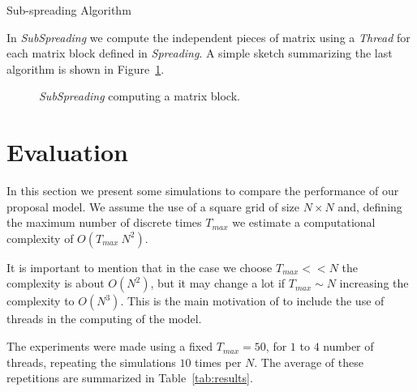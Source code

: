 \documentclass[conference]{IEEEtran}
\begin{document}
      \begin{algorithm}[!ht]
        \begin{algorithmic}
              \EndFor
            \EndFor
          \EndProcedure
        \end{algorithmic}
        \caption{Sub-spreading Algorithm}
        \label{alg:subspreading}
      \end{algorithm}
      
      In \emph{SubSpreading} we compute the independent pieces of matrix using a \emph{Thread} for each 
      matrix block defined in \emph{Spreading}. A simple sketch summarizing the last algorithm is shown 
      in Figure~\ref{fig:thread}. 
      \begin{figure}
        \centering
        \resizebox{\columnwidth}{!}{
          
        }    
        \caption{\emph{SubSpreading} computing a matrix block.}
        \label{fig:thread}
      \end{figure}
        
        
  \section{Evaluation}
    
    In this section we present some simulations to compare the performance of our proposal model.
    We assume the use of a square grid of size $N \times N$ and, defining the maximum number
    of discrete times $T_{max}$ we estimate a computational complexity of $O(T_{max} ~ N^2)$. 
    
    It is important to mention that in the case we choose $T_{max} << N$ the complexity is about $O(N^2)$,
    but it may change a lot if $T_{max}\sim N$ increasing the complexity to $O(N^3)$. This is the main 
    motivation of to include the use of threads in the computing of the model.
    
    The experiments were made using a fixed $T_{max}=50$, for $1$ to $4$ number of threads, repeating the 
    simulations $10$ times per $N$. The average of these repetitions are summarized in Table~\ref{tab:results}.
    
\end{document}

